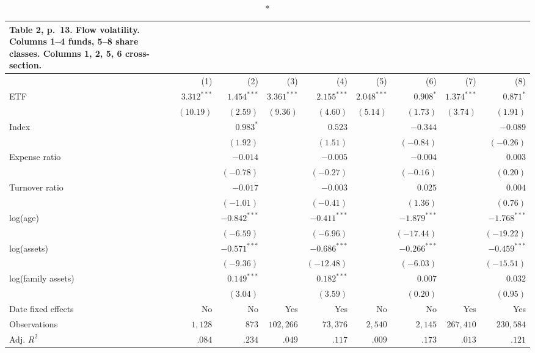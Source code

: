 \documentclass[10pt,a4paper]{article}
\begin{document}
{\scriptsize\setlength{\tabcolsep}{4pt}
\begin{longtable}{@{}l*{8}{r}@{}}
\caption*{\textbf{Table 2, p.~13. Flow volatility. Columns 1--4 funds, 5--8 share classes. Columns 1, 2, 5, 6 cross-section.}}\\
\toprule
 & (1) & (2) & (3) & (4) & (5) & (6) & (7) & (8)\\
\midrule\endhead
ETF & $3.312^{***}$ & $1.454^{***}$ & $3.361^{***}$ & $2.155^{***}$ & $2.048^{***}$ & $0.908^{*}$ & $1.374^{***}$ & $0.871^{*}$\\
 & $(10.19)$ & $(2.59)$ & $(9.36)$ & $(4.60)$ & $(5.14)$ & $(1.73)$ & $(3.74)$ & $(1.91)$\\
Index &  & $0.983^{*}$ &  & $0.523$ &  & $-0.344$ &  & $-0.089$\\
 &  & $(1.92)$ &  & $(1.51)$ &  & $(-0.84)$ &  & $(-0.26)$\\
Expense ratio &  & $-0.014$ &  & $-0.005$ &  & $-0.004$ &  & $0.003$\\
 &  & $(-0.78)$ &  & $(-0.27)$ &  & $(-0.16)$ &  & $(0.20)$\\
Turnover ratio &  & $-0.017$ &  & $-0.003$ &  & $0.025$ &  & $0.004$\\
 &  & $(-1.01)$ &  & $(-0.41)$ &  & $(1.36)$ &  & $(0.76)$\\
log(age) &  & $-0.842^{***}$ &  & $-0.411^{***}$ &  & $-1.879^{***}$ &  & $-1.768^{***}$\\
 &  & $(-6.59)$ &  & $(-6.96)$ &  & $(-17.44)$ &  & $(-19.22)$\\
log(assets) &  & $-0.571^{***}$ &  & $-0.686^{***}$ &  & $-0.266^{***}$ &  & $-0.459^{***}$\\
 &  & $(-9.36)$ &  & $(-12.48)$ &  & $(-6.03)$ &  & $(-15.51)$\\
log(family assets) &  & $0.149^{***}$ &  & $0.182^{***}$ &  & $0.007$ &  & $0.032$\\
 &  & $(3.04)$ &  & $(3.59)$ &  & $(0.20)$ &  & $(0.95)$\\
Date fixed effects & No & No & Yes & Yes & No & No & Yes & Yes\\
Observations & $1{,}128$ & $873$ & $102{,}266$ & $73{,}376$ & $2{,}540$ & $2{,}145$ & $267{,}410$ & $230{,}584$\\
Adj. $R^2$ & $.084$ & $.234$ & $.049$ & $.117$ & $.009$ & $.173$ & $.013$ & $.121$\\
\bottomrule
\end{longtable}}
\end{document}

